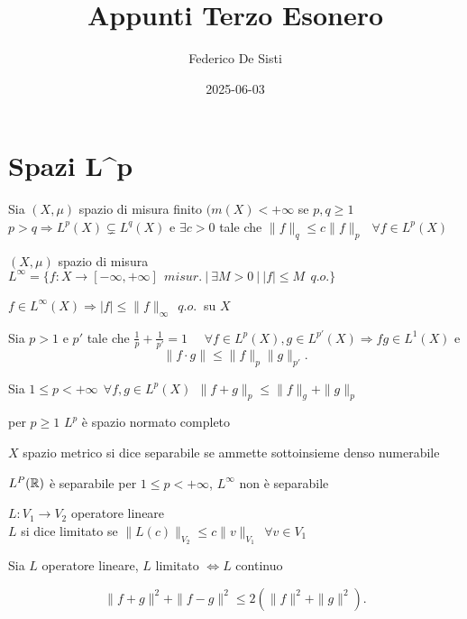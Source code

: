 \documentclass[12px]{article}
\title{Appunti Terzo Esonero}
\date{2025-06-03}
\author{Federico De Sisti}
\begin{document}
	\maketitle
	\newpage
	\section{Spazi L^p}
	\begin{prop}
		Sia $(X,\mu)$ spazio di misura finito  $(
		m(X) < +\infty$ se  $p,q \geq 1$  $ p > q \Rightarrow  L^p(X)\subsetneq L^q(X)$ e $\exists c > 0$ tale che  $\|f\|_q \leq c\|f\|_p\ \ \ \forall f\in L^p(X)$
	\end{prop}
	\begin{defi}
		$(X,\mu)$ spazio di misura  $L^\infty = \{f: X \rightarrow [-\infty, +\infty] \ \ misur.\ | \ \exists M > 0 \ | \ |f|\leq M \ \ q.o.\}$
	\end{defi}
	\begin{lemm}
		$f\in L^\infty(X) \Rightarrow |f|\leq \|f\|_\infty\ \ q.o. \ $ su $X$
	\end{lemm}
	\begin{prop}[Holder]
		Sia $p> 1 $ e  $p'$ tale che  $\frac 1 p + \frac 1 {p'} = 1$ \ \  $\forall f\in L^p(X), g\in L^{p'}(X) \Rightarrow  fg\in L^1(X)$ e 
		\[
			\|f\cdot g\|\leq \|f\|_p\|g\|_{p'}
		.\] 
	\end{prop}
	\begin{prop}[Minkoski]
		Sia $1\leq p < +\infty \ \ \forall f,g\in L^p(X)\ \ \|f+g\|_p\leq \|f\|_g + \|g\|_p$
	\end{prop}
	\begin{teo}
		per $p\geq 1$  $L^p$ è spazio normato completo
	\end{teo}
	\begin{defi}
		$X$ spazio metrico si dice separabile se ammette sottoinsieme denso numerabile
	\end{defi}
	\begin{teo}
		$L^P(\mathbb{R})$ è separabile per  $1\leq p < +\infty$,  $L^\infty$ non è separabile
	\end{teo}
	\begin{defi}
		$L: V_1 \rightarrow V_2$ operatore lineare \\
		$L$ si dice limitato se $\|L(c)\|_{V_2} \leq c\|v\|_{V_1}\ \ \forall v\in V_1$
	\end{defi}
	\begin{teo}
		Sia $L$ operatore lineare,  $L$ limitato $ \Leftrightarrow L$ continuo
	\end{teo}
	\begin{teo}[Parallelogramma]
		\[
		\|f+g\|^2 + \|f-g\|^2 \leq 2(\|f\|^2 + \|g\|^2)
		.\] 
	\end{teo}
\end{document}
